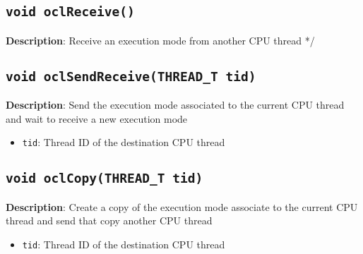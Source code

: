 \subsection{\texttt{void oclReceive()}}

\textbf{Description}: Receive an execution mode from another CPU thread */

\subsection{\texttt{void oclSendReceive(THREAD\_T tid)}}

\textbf{Description}: Send the execution mode associated to the current CPU thread and wait to receive a new execution mode
\begin{itemize}
  \item \texttt{tid}: Thread ID of the destination CPU thread
\end{itemize}

\subsection{\texttt{void oclCopy(THREAD\_T tid)}}

\textbf{Description}: Create a copy of the execution mode associate to the current CPU thread and send that copy another CPU thread
\begin{itemize}
  \item \texttt{tid}: Thread ID of the destination CPU thread
\end{itemize}

